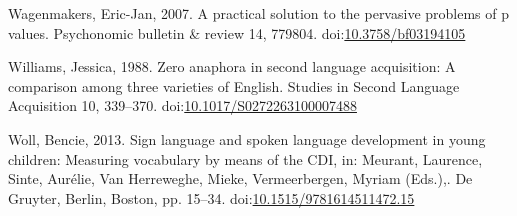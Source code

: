 \documentclass[]{elsarticle} %
\newlength{\cslhangindent}
\newenvironment{CSLReferences}[2] %
 {%
  \setlength{\parindent}{0pt}
  \ifodd #1 \everypar{\setlength{\hangindent}{\cslhangindent}}\ignorespaces\fi
  \ifnum #2 > 0
  \setlength{\parskip}{#2\baselineskip}
  \fi
 }%
 {}
\begin{document}
\begin{CSLReferences}{1}{0}
\leavevmode{}%
Wagenmakers, Eric-Jan, 2007. A practical solution to the pervasive
problems of p values. Psychonomic bulletin \& review 14, 779804.
doi:\href{https://doi.org/10.3758/bf03194105}{10.3758/bf03194105}

\leavevmode{}%
Williams, Jessica, 1988. Zero anaphora in second language acquisition: A
comparison among three varieties of English. Studies in Second Language
Acquisition 10, 339--370.
doi:\href{https://doi.org/10.1017/S0272263100007488}{10.1017/S0272263100007488}

\leavevmode{}%
Woll, Bencie, 2013. Sign language and spoken language development in
young children: Measuring vocabulary by means of the CDI, in: Meurant,
Laurence, Sinte, Aurélie, Van Herreweghe, Mieke, Vermeerbergen, Myriam
(Eds.),. De Gruyter, Berlin, Boston, pp. 15--34.
doi:\href{https://doi.org/10.1515/9781614511472.15}{10.1515/9781614511472.15}

\end{CSLReferences}
\end{document}

